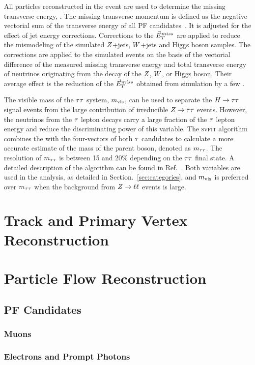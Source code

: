 All particles reconstructed in the event are used to determine the missing transverse energy,
\etvecmiss. The missing transverse momentum is defined as the negative vectorial sum of the transverse energy of
all PF candidates~\cite{Khachatryan:2014gga}. It is adjusted for the effect of jet energy corrections.
Corrections to the $\vec{E}^{miss}_T$ are applied to reduce the mismodeling of the simulated
$Z$+jets, $W$+jets and Higgs boson samples.
The corrections are applied to the simulated events on the basis of the vectorial difference
of the measured missing transverse energy and total transverse energy of neutrinos
originating from the decay of the $Z$, $W$, or Higgs boson. Their average effect is the reduction of the $\vec{E}^{miss}_T$ obtained from simulation by a few \GeV.

The visible mass of the $\tau\tau$ system, $m_\text{vis}$, can be used to separate
the $H\to \tau \tau$ signal events
from the large contribution of irreducible $Z \to \tau \tau$ events.
However, the neutrinos from the $\tau$ lepton decays carry a large fraction of
the $\tau$ lepton energy and reduce the discriminating power of this variable.
The \textsc{svfit} algorithm combines the \etvecmiss with the four-vectors of both $\tau$ candidates
to calculate a more accurate estimate of the mass of the parent boson, denoted as $m_{\tau\tau}$. The resolution of $m_{\tau\tau}$ is between 15 and 20\% depending on the $\tau\tau$ final state.
A detailed description of the algorithm can be found
in Ref.~\cite{Bianchini:2014vza}. Both variables are used in the analysis, as detailed in Section.~\ref{sec:categories}, and $m_\text{vis}$ is preferred over $m_{\tau\tau}$ when the background from $Z \to \ell\ell$ events is large.

\section{Track and Primary Vertex Reconstruction}
\section{Particle Flow Reconstruction}
\subsection{PF Candidates}
\subsubsection{Muons}
\subsubsection{Electrons and Prompt Photons}
